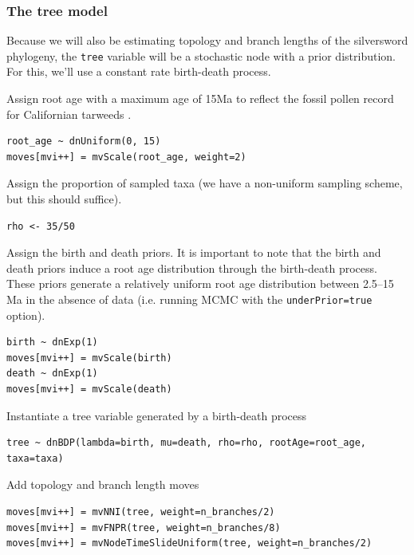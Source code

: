 \subsubsection{The tree model}

Because we will also be estimating topology and branch lengths of the silversword phylogeny, the {\tt tree} variable will be a stochastic node with a prior distribution.
For this, we'll use a constant rate birth-death process.

Assign root age with a maximum age of 15Ma to reflect the fossil pollen record for Californian tarweeds \citep{Baldwin1998}.

\begin{snugshade}
\begin{lstlisting}
root_age ~ dnUniform(0, 15)
moves[mvi++] = mvScale(root_age, weight=2)
\end{lstlisting}
\end{snugshade}

Assign the proportion of sampled taxa (we have a non-uniform sampling scheme, but this should suffice).

\begin{snugshade}
\begin{lstlisting}
rho <- 35/50
\end{lstlisting}
\end{snugshade}

Assign the birth and death priors.
It is important to note that the birth and death priors induce a root age distribution through the birth-death process.
These priors generate a relatively uniform root age distribution between 2.5--15 Ma in the absence of data (i.e. running MCMC with the {\tt underPrior=true} option).
\begin{snugshade}
\begin{lstlisting}
birth ~ dnExp(1)
moves[mvi++] = mvScale(birth)
death ~ dnExp(1)
moves[mvi++] = mvScale(death)
\end{lstlisting}
\end{snugshade}

Instantiate a tree variable generated by a birth-death process
\begin{snugshade}
\begin{lstlisting}
tree ~ dnBDP(lambda=birth, mu=death, rho=rho, rootAge=root_age, taxa=taxa)
\end{lstlisting}
\end{snugshade}


Add topology and branch length moves
\begin{snugshade}
\begin{lstlisting}
moves[mvi++] = mvNNI(tree, weight=n_branches/2)
moves[mvi++] = mvFNPR(tree, weight=n_branches/8)
moves[mvi++] = mvNodeTimeSlideUniform(tree, weight=n_branches/2)
\end{lstlisting}
\end{snugshade}


